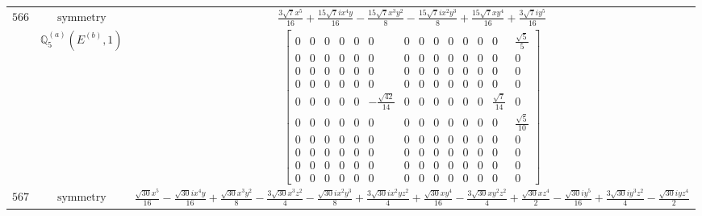 \documentclass[fleqn,8pt,landscape]{jsarticle}
\begin{document}
\begin{longtable}{ccc}
$ 566 $ & $ \text{symmetry} $ & $ \frac{3 \sqrt{7} x^{5}}{16} + \frac{15 \sqrt{7} i x^{4} y}{16} - \frac{15 \sqrt{7} x^{3} y^{2}}{8} - \frac{15 \sqrt{7} i x^{2} y^{3}}{8} + \frac{15 \sqrt{7} x y^{4}}{16} + \frac{3 \sqrt{7} i y^{5}}{16} $ \\
$  $ & $ \mathbb{Q}_{5}^{(a)}(E^{(b)},1) $ & $ \begin{bmatrix} 0 & 0 & 0 & 0 & 0 & 0 & 0 & 0 & 0 & 0 & 0 & 0 & 0 & \frac{\sqrt{5}}{5} \\ 0 & 0 & 0 & 0 & 0 & 0 & 0 & 0 & 0 & 0 & 0 & 0 & 0 & 0 \\ 0 & 0 & 0 & 0 & 0 & 0 & 0 & 0 & 0 & 0 & 0 & 0 & 0 & 0 \\ 0 & 0 & 0 & 0 & 0 & 0 & 0 & 0 & 0 & 0 & 0 & 0 & 0 & 0 \\ 0 & 0 & 0 & 0 & 0 & - \frac{\sqrt{42}}{14} & 0 & 0 & 0 & 0 & 0 & 0 & \frac{\sqrt{7}}{14} & 0 \\ 0 & 0 & 0 & 0 & 0 & 0 & 0 & 0 & 0 & 0 & 0 & 0 & 0 & \frac{\sqrt{5}}{10} \\ 0 & 0 & 0 & 0 & 0 & 0 & 0 & 0 & 0 & 0 & 0 & 0 & 0 & 0 \\ 0 & 0 & 0 & 0 & 0 & 0 & 0 & 0 & 0 & 0 & 0 & 0 & 0 & 0 \\ 0 & 0 & 0 & 0 & 0 & 0 & 0 & 0 & 0 & 0 & 0 & 0 & 0 & 0 \\ 0 & 0 & 0 & 0 & 0 & 0 & 0 & 0 & 0 & 0 & 0 & 0 & 0 & 0 \end{bmatrix} $ \\ \hline
$ 567 $ & $ \text{symmetry} $ & $ \frac{\sqrt{30} x^{5}}{16} - \frac{\sqrt{30} i x^{4} y}{16} + \frac{\sqrt{30} x^{3} y^{2}}{8} - \frac{3 \sqrt{30} x^{3} z^{2}}{4} - \frac{\sqrt{30} i x^{2} y^{3}}{8} + \frac{3 \sqrt{30} i x^{2} y z^{2}}{4} + \frac{\sqrt{30} x y^{4}}{16} - \frac{3 \sqrt{30} x y^{2} z^{2}}{4} + \frac{\sqrt{30} x z^{4}}{2} - \frac{\sqrt{30} i y^{5}}{16} + \frac{3 \sqrt{30} i y^{3} z^{2}}{4} - \frac{\sqrt{30} i y z^{4}}{2} $ \\

\end{longtable}
\end{document}
